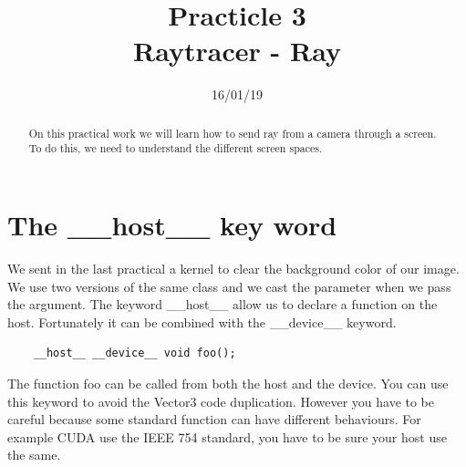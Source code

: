 \documentclass{article}
\begin{document}
\title{Practicle 3\\Raytracer - Ray}
\date{16/01/19}
\maketitle

\begin{abstract}
	On this practical work we will learn how to send ray from a camera through a screen. To do this, we need to understand the different screen spaces.
\end{abstract}

\section{The \_\_host\_\_ key word}
We sent in the last practical a kernel to clear the background color of our image. We use two versions of the same class and we cast the parameter when we pass the argument. The keyword \_\_host\_\_ allow us to declare a function on the host. Fortunately it can be combined with the \_\_device\_\_ keyword. 
\begin{lstlisting}
	__host__ __device__ void foo();
\end{lstlisting}
The function foo can be called from both the host and the device. You can use this keyword to avoid the Vector3 code duplication. However you have to be careful because some standard function can have different behaviours. For example CUDA use the IEEE 754 standard, you have to be sure your host use the same.\\
\end{document}
